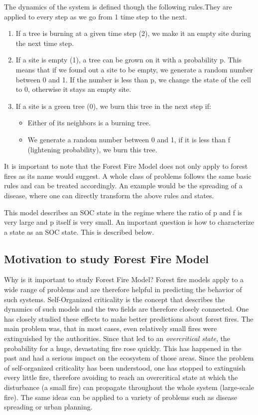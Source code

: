 \documentclass[11pt]{article}
\begin{document}
The dynamics of the system is defined though the following rules.They are applied to every step as we go from 1 time step to the next.
\begin{enumerate}
\item If a tree is burning at a given time step (2), we make it an empty site during the next time step.
\item If a site is empty (1), a tree can be grown on it with a probability p. This means that if we found out a site to be empty, we generate a random number between 0 and 1. If the number is less than p, we change the state of the cell to 0, otherwise it stays an empty site.
\item If a site is a green tree (0), we burn this tree in the next step if:

\begin{itemize}
\item Either of its neighbors is a burning tree.
\item We generate a random number between 0 and 1, if it is less than f (lightening probability), we burn this tree.
\end{itemize}
\end{enumerate}

It is important to note that the Forest Fire Model does not only apply to forest fires as its name would suggest. A whole class of problems follows the same basic rules and can be treated accordingly. An example would be the spreading of a disease, where one can directly transform the above rules and states.

This model describes an SOC state in the regime where the ratio of p and f is very large and p itself is very small. An important question is how to characterize a state as an SOC state. This is described below.

\subsection{Motivation to study Forest Fire Model}
Why is it important to study Forest Fire Model? Forest fire models apply to a wide range of problems and are therefore helpful in predicting the behavior of such systems. Self-Organized criticality is the concept that describes the dynamics of such models and the two fields are therefore closely connected. One has closely studied these effects to make better predictions about forest fires. The main problem was, that in most cases, even relatively small fires were extinguished by the authorities. Since that led to an \textit{overcritical state}, the probability for a huge, devastating fire rose quickly. This has happened in the past and had a serious impact on the ecosystem of those areas.
Since the problem of self-organized criticality has been understood, one has stopped to extinguish every little fire, therefore avoiding to reach an overcritical state at which the disturbance (a small fire) can propagate throughout the whole system (large-scale fire). 
The same ideas can be applied to a variety of problems such as disease spreading or urban planning.
\end{document}

